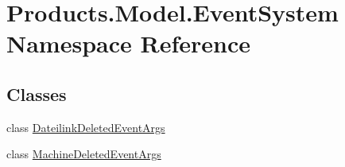 \hypertarget{namespace_products_1_1_model_1_1_event_system}{}\section{Products.\+Model.\+Event\+System Namespace Reference}
\label{namespace_products_1_1_model_1_1_event_system}
\subsection*{Classes}
\begin{DoxyCompactItemize}
\item 
class \hyperlink{class_products_1_1_model_1_1_event_system_1_1_dateilink_deleted_event_args}{Dateilink\+Deleted\+Event\+Args}
\item 
class \hyperlink{class_products_1_1_model_1_1_event_system_1_1_machine_deleted_event_args}{Machine\+Deleted\+Event\+Args}
\end{DoxyCompactItemize}
